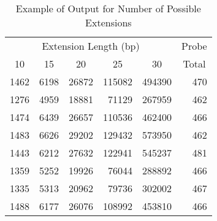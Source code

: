 \begin{table}[bth]
\caption{Example of Output for Number of Possible Extensions}
\label{table2}
\begin{center}
\begin{tabular}{||rrrrr|r||}  \hline
\multicolumn{5}{||c|}{Extension Length (bp)} & \multicolumn{1}{c||}{Probe} \\ 
\multicolumn{1}{||c}{10} & \multicolumn{1}{c}{15} &
\multicolumn{1}{c}{20} & \multicolumn{1}{c}{25} & \multicolumn{1}{c}{30} &
\multicolumn{1}{|c||}{Total} \\ \hline
  1462 & 6198 & 26872 & 115082 & 494390 & 470 \\
  1276 & 4959 & 18881 &  71129 & 267959 & 462 \\
  1474 & 6439 & 26657 & 110536 & 462400 & 466 \\
  1483 & 6626 & 29202 & 129432 & 573950 & 462 \\
  1443 & 6212 & 27632 & 122941 & 545237 & 481 \\
  1359 & 5252 & 19926 &  76044 & 288892 & 466 \\
  1335 & 5313 & 20962 &  79736 & 302002 & 467 \\
  1488 & 6177 & 26076 & 108992 & 453810 & 466 \\ \hline
\end{tabular}
\end{center}
\end{table}
